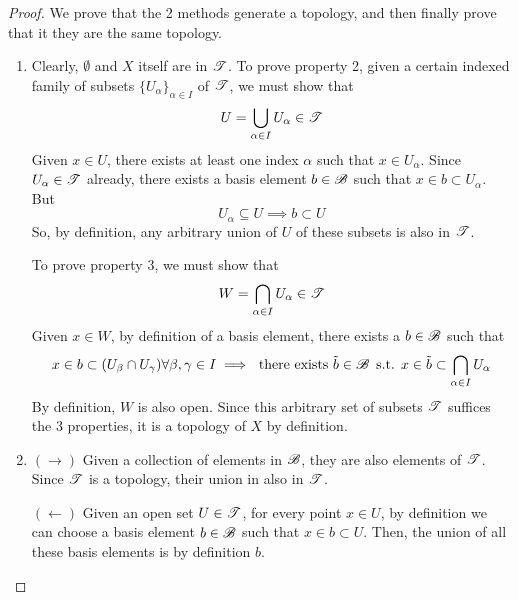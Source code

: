   \begin{proof}
    We prove that the 2 methods generate a topology, and then finally prove that it they are the same topology. 
    \begin{enumerate}
      \item Clearly, $\emptyset$ and $X$ itself are in $\T$. To prove property 2, given a certain indexed family of subsets $\{U_\alpha\}_{\alpha \in I}$ of $\T$, we must show that 
      \begin{equation}
        U = \bigcup_{\alpha \in I} U_\alpha \in \T
      \end{equation}
      Given $x \in U$, there exists at least one index $\alpha$ such that $x \in U_\alpha$. Since $U_\alpha \in \T$ already, there exists a basis element $b \in \B$ such that $x \in b \subset U_\alpha$. But 
      \begin{equation}
        U_\alpha \subseteq U \implies b \subset U
      \end{equation}
      So, by definition, any arbitrary union of $U$ of these subsets is also in $\T$. 

      To prove property 3, we must show that 
      \begin{equation}
        W = \bigcap_{\alpha \in I} U_\alpha \in \T
      \end{equation}
      Given $x \in W$, by definition of a basis element, there exists a $b \in \B$ such that 
      \begin{equation}
        x \in b \subset (U_\beta \cap U_\gamma) \forall \beta, \gamma \in I \implies \text{ there exists } \Tilde{b} \in \B \text{ s.t. } x \in \Tilde{b} \subset \bigcap_{\alpha \in I} U_\alpha
      \end{equation}
      By definition, $W$ is also open. Since this arbitrary set of subsets $\T$ suffices the 3 properties, it is a topology of $X$ by definition. 

      \item $(\rightarrow)$ Given a collection of elements in $\B$, they are also elements of $\T$. Since $\T$ is a topology, their union in also in $\T$. 

      $(\leftarrow)$ Given an open set $U \in \T$, for every point $x \in U$, by definition we can choose a basis element $b \in \B$ such that $x \in b \subset U$. Then, the union of all these basis elements is by definition $b$. 
        
    \end{enumerate}
  \end{proof}

